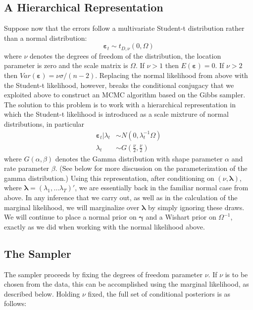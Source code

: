 \documentclass[12pt]{article}
\begin{document}
\subsection{A Hierarchical Representation}
Suppose now that the errors follow a multivariate Student-t distribution rather than a normal distribution: 
\begin{equation*}
  \boldsymbol{\varepsilon}_{t}\sim t_{D,\nu }\left( 0,\Omega \right)
\end{equation*}
where $\nu$ denotes the degrees of freedom of the distribution, the location parameter is zero and the scale matrix is $\Omega$.
If $\nu >1$ then $E(\boldsymbol{\varepsilon}) = 0$. 
If $\nu>2$ then $Var\left( \boldsymbol{\varepsilon} \right) = \nu \sigma/(n-2)$.
Replacing the normal likelihood from above with the Student-t likelihood, however, breaks the conditional conjugacy that we exploited above to construct an MCMC algorithm based on the Gibbs sampler.
The solution to this problem is to work with a hierarchical representation in which the Student-t likelihood is introduced as a scale mixtrure of normal distributions, in particular
\begin{align*}
  \boldsymbol{\varepsilon}_{t}|\lambda _{t} &\sim N\left( 0,\lambda _{t}^{-1}\Omega \right)
\\
\lambda _{t} &\sim G\left( \frac{\nu }{2},\frac{\nu }{2}\right)
\end{align*}
where $G(\alpha,\beta)$ denotes the Gamma distribution with shape parameter $\alpha$ and rate parameter $\beta$.
(See below for more discussion on the parameterization of the gamma distribution.)
Using this representation, after conditioning on $\left( \nu, \boldsymbol{\lambda} \right)$, where $\boldsymbol{\lambda} = (\lambda_1, \dots \lambda_T)'$, we are essentially back in the familiar normal case from above.
In any inference that we carry out, as well as in the calculation of the marginal likelihood, we will marginalize over $\boldsymbol{\lambda}$ by simply ignoring these draws.
We will continue to place a normal prior on $\boldsymbol{\gamma}$ and a Wishart prior on $\Omega^{-1}$, exactly as we did when working with the normal likelihood above.

\subsection{The Sampler}
The sampler proceeds by fixing the degrees of freedom parameter $\nu$.
If $\nu$ is to be chosen from the data, this can be accomplished using the marginal likelihood, as described below.
Holding $\nu$ fixed, the full set of conditional posteriors is as follows:
\end{document}
